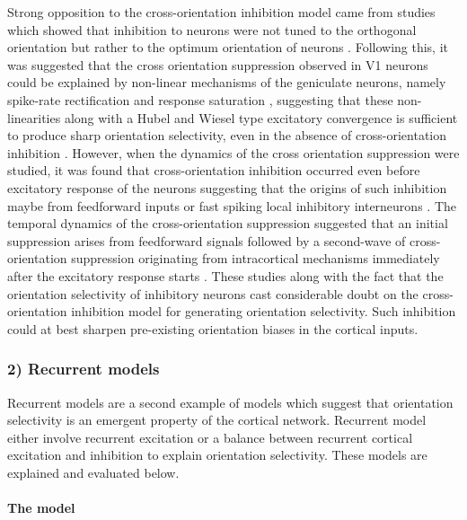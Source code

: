 Strong opposition to the cross-orientation inhibition model came from studies which showed that inhibition to neurons were not tuned to the orthogonal orientation but rather to the optimum orientation of neurons \cite{Anderson2000, Roerig2002, Tan2011a}. Following this, it was suggested that the cross orientation suppression observed in V1 neurons could be explained by non-linear mechanisms of the geniculate neurons, namely spike-rate rectification and response saturation \cite{Priebe2006}, suggesting that these non-linearities along with a Hubel and Wiesel type excitatory convergence is sufficient to produce sharp orientation selectivity, even in the absence of cross-orientation inhibition  \cite{Priebe2006, Priebe2012, Priebe2016}. However, when the dynamics of the cross orientation suppression were studied, it was found that cross-orientation inhibition occurred even before excitatory response of the neurons suggesting that the origins of such inhibition maybe from feedforward inputs or fast spiking local inhibitory interneurons \cite{Smith2006}. The temporal dynamics of the cross-orientation suppression suggested that an initial suppression arises from feedforward signals \cite{Freeman2002, Li2006} followed by a second-wave of cross-orientation suppression originating from intracortical mechanisms immediately after the excitatory response starts \cite{Kimura2009}. These studies along with the fact that the orientation selectivity of inhibitory neurons cast considerable doubt on the cross- orientation inhibition model for generating orientation selectivity. Such inhibition could at best sharpen pre-existing orientation biases in the cortical inputs.

\subsubsection{2) Recurrent models}

Recurrent models are a second example of models which suggest that orientation selectivity is an emergent property of the cortical network. Recurrent model either involve recurrent excitation or a balance between recurrent cortical excitation and inhibition to explain orientation selectivity. These models are explained and evaluated below.

\paragraph{The model}

